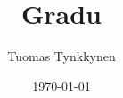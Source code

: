 \documentclass[finnish]{tktltiki2/tktltiki2}
\title{Gradu}
\author{Tuomas Tynkkynen}
\date{\today}
\theoremstyle{definition}
\theoremstyle{remark}
\begin{document}


\frontmatter      %
\maketitle        %
\makeabstract     %

\tableofcontents  %


\mainmatter


%
%
% 
%

% 
% 

\nocite{*}


\end{document}
